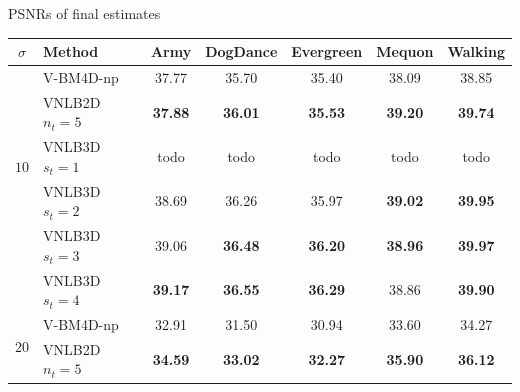 \documentclass[mathserif, 8pt]{beamer}
\newcommand{\best}[1]{\textbf{\textcolor{MyOrange}{#1}}}
\newcommand{\Best}[1]{\textbf{\textcolor{MyOrangeBrighter}{#1}}}
\begin{document}
\begin{frame}{PSNRs of final estimates}


	\begin{center}
	{\tiny
	\renewcommand{\tabcolsep}{2mm}
	\renewcommand{\arraystretch}{1.0}
	\begin{tabular}{ c | l |c c c c c}
		\hline
		\rule{0pt}{6pt}$\sigma$ & Method        & Army & DogDance & Evergreen & Mequon & Walking  \\\hline
		\multirow{5}{*}{$10$} & V-BM4D-np        &       37.77  &       35.70  &       35.40  &       38.09  &       38.85  \\
		                      & VNLB2D $n_t = 5$ & \best{37.88} & \best{36.01} & \best{35.53} & \Best{39.20} & \best{39.74} \\
		                      & VNLB3D $s_t = 1$ &       todo   &       todo   &       todo   &       todo   &       todo   \\
		                      & VNLB3D $s_t = 2$ &       38.69  &       36.26  &       35.97  & \best{39.02} & \Best{39.95} \\
		                      & VNLB3D $s_t = 3$ &       39.06  & \Best{36.48} & \Best{36.20} & \best{38.96} & \Best{39.97} \\
		                      & VNLB3D $s_t = 4$ & \Best{39.17} & \Best{36.55} & \Best{36.29} &       38.86  & \Best{39.90} \\\hline
%
		\multirow{5}{*}{$20$} & V-BM4D-np        &       32.91  &       31.50  &       30.94  &       33.60  &       34.27  \\
		                      & VNLB2D $n_t = 5$ & \best{34.59} & \best{33.02} & \best{32.27} & \best{35.90} & \best{36.12} \\

\end{tabular}}
\end{center}
\end{frame}
\end{document}

